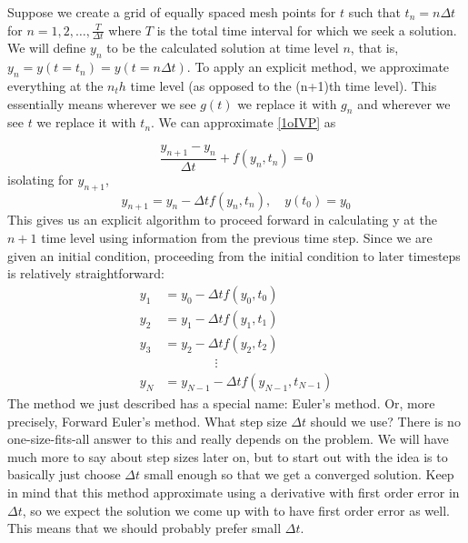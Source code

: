 \documentclass[]{article}
\theoremstyle{definition}
\numberwithin{equation}{section}
\begin{document}
	Suppose we create a grid of equally spaced mesh points for $t$ such that $ t_n = n\Delta t$ for $n = 1, 2,\ldots,\frac{T}{\Delta t}$ where $T$ is the total time interval for which we seek a solution. We will define $y_n$ to be the calculated solution at time level $n$, that is, $y_n = y(t = t_n) = y( t = n\Delta t )$. To apply an explicit method, we approximate everything at the $n_th$ time level (as opposed to the (n+1)th time level). This essentially means wherever we see $g(t)$ we replace it with $g_n$ and wherever we see $t$ we replace it with $t_n$. We can approximate \eqref{1oIVP} as
	
	\begin{equation}
	\frac{y_{n+1} - y_n}{\Delta t} + f(y_n,t_n) = 0
	\end{equation}
	isolating for $y_{n+1}$,
	\begin{equation}
	y_{n+1} = y_n - \Delta t f(y_n,t_n), \quad y(t_0) = y_0
	\end{equation}
	This gives us an explicit algorithm to proceed forward in calculating y at the $n+1$ time level using information from the previous time step. Since we are given an initial condition, proceeding from the initial condition to later timesteps is relatively straightforward:
	\begin{align*}
	y_1 &= y_0 - \Delta t f(y_0,t_0) \\
	y_2 &= y_1 - \Delta t f(y_1,t_1) \\
	y_3 &= y_2 - \Delta t f(y_2,t_2) \\
	& \qquad \qquad \vdots \\
	y_N & = y_{N-1} - \Delta tf(y_{N-1},t_{N-1})	 
	\end{align*}
	The method we just described has a special name: Euler's method. Or, more precisely, Forward Euler's method. What step size $\Delta t$ should we use? There is no one-size-fits-all answer to this and really depends on the problem. We will have much more to say about step sizes later on, but to start out with the idea is to basically just choose $\Delta t$ small enough so that we get a converged solution. Keep in mind that this method approximate using a derivative with first order error in $\Delta t$, so we expect the solution we come up with to have first order error as well. This means that we should probably prefer small $\Delta t$.
	
\end{document}

